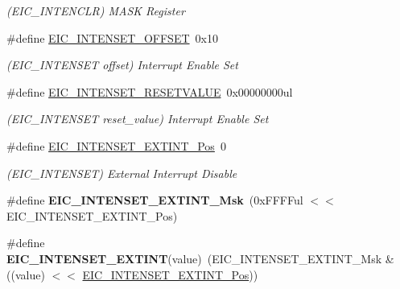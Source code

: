 \begin{DoxyCompactItemize}
\begin{DoxyCompactList}\small\item\em (E\+I\+C\+\_\+\+I\+N\+T\+E\+N\+C\+L\+R) M\+A\+S\+K Register \end{DoxyCompactList}\item 
\hypertarget{group___s_a_m_l21___e_i_c_ga7544cf9b337e414ddccd4d849d263bc9}{}\#define \hyperlink{group___s_a_m_l21___e_i_c_ga7544cf9b337e414ddccd4d849d263bc9}{E\+I\+C\+\_\+\+I\+N\+T\+E\+N\+S\+E\+T\+\_\+\+O\+F\+F\+S\+E\+T}~0x10\label{group___s_a_m_l21___e_i_c_ga7544cf9b337e414ddccd4d849d263bc9}

\begin{DoxyCompactList}\small\item\em (E\+I\+C\+\_\+\+I\+N\+T\+E\+N\+S\+E\+T offset) Interrupt Enable Set \end{DoxyCompactList}\item 
\hypertarget{group___s_a_m_l21___e_i_c_gae72659b00ea4c8017352485df071fff8}{}\#define \hyperlink{group___s_a_m_l21___e_i_c_gae72659b00ea4c8017352485df071fff8}{E\+I\+C\+\_\+\+I\+N\+T\+E\+N\+S\+E\+T\+\_\+\+R\+E\+S\+E\+T\+V\+A\+L\+U\+E}~0x00000000ul\label{group___s_a_m_l21___e_i_c_gae72659b00ea4c8017352485df071fff8}

\begin{DoxyCompactList}\small\item\em (E\+I\+C\+\_\+\+I\+N\+T\+E\+N\+S\+E\+T reset\+\_\+value) Interrupt Enable Set \end{DoxyCompactList}\item 
\hypertarget{group___s_a_m_l21___e_i_c_gafd6be1eb2fc6554616eb65915a12c245}{}\#define \hyperlink{group___s_a_m_l21___e_i_c_gafd6be1eb2fc6554616eb65915a12c245}{E\+I\+C\+\_\+\+I\+N\+T\+E\+N\+S\+E\+T\+\_\+\+E\+X\+T\+I\+N\+T\+\_\+\+Pos}~0\label{group___s_a_m_l21___e_i_c_gafd6be1eb2fc6554616eb65915a12c245}

\begin{DoxyCompactList}\small\item\em (E\+I\+C\+\_\+\+I\+N\+T\+E\+N\+S\+E\+T) External Interrupt Disable \end{DoxyCompactList}\item 
\hypertarget{group___s_a_m_l21___e_i_c_gafb39751004f288b53ff8530265a67eaa}{}\#define {\bfseries E\+I\+C\+\_\+\+I\+N\+T\+E\+N\+S\+E\+T\+\_\+\+E\+X\+T\+I\+N\+T\+\_\+\+Msk}~(0x\+F\+F\+F\+Ful $<$$<$ E\+I\+C\+\_\+\+I\+N\+T\+E\+N\+S\+E\+T\+\_\+\+E\+X\+T\+I\+N\+T\+\_\+\+Pos)\label{group___s_a_m_l21___e_i_c_gafb39751004f288b53ff8530265a67eaa}

\item 
\hypertarget{group___s_a_m_l21___e_i_c_ga22189f36f0881268c4c82ace424dff16}{}\#define {\bfseries E\+I\+C\+\_\+\+I\+N\+T\+E\+N\+S\+E\+T\+\_\+\+E\+X\+T\+I\+N\+T}(value)~(E\+I\+C\+\_\+\+I\+N\+T\+E\+N\+S\+E\+T\+\_\+\+E\+X\+T\+I\+N\+T\+\_\+\+Msk \& ((value) $<$$<$ \hyperlink{group___s_a_m_l21___e_i_c_gafd6be1eb2fc6554616eb65915a12c245}{E\+I\+C\+\_\+\+I\+N\+T\+E\+N\+S\+E\+T\+\_\+\+E\+X\+T\+I\+N\+T\+\_\+\+Pos}))\label{group___s_a_m_l21___e_i_c_ga22189f36f0881268c4c82ace424dff16}


\end{DoxyCompactItemize}
